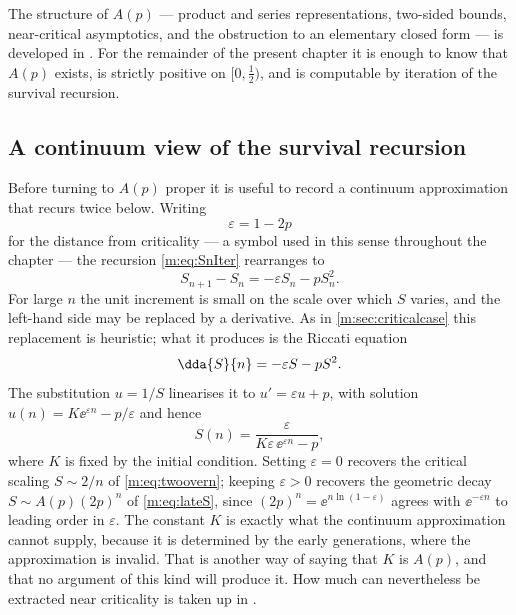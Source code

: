 The structure of $A(p)$ --- product and series representations, two-sided bounds,
near-critical asymptotics, and the obstruction to an elementary closed form --- is
developed in \ChA. For the remainder of the present chapter it is enough to know
that $A(p)$ exists, is strictly positive on $[0,\tfrac12)$, and is computable by
iteration of the survival recursion.

\subsection{A continuum view of the survival recursion}
\label{m:sec:riccati}

Before turning to $A(p)$ proper it is useful to record a continuum approximation
that recurs twice below. Writing
\begin{equation}
\label{m:eq:epsdef}
\varepsilon = 1-2p
\end{equation}
for the distance from criticality --- a symbol used in this sense throughout the
chapter --- the recursion \cref{m:eq:SnIter} rearranges to
\begin{equation}
\label{m:eq:Sdiff}
S_{n+1}-S_n = -\varepsilon S_n - pS_n^2 .
\end{equation}
For large $n$ the unit increment is small on the scale over which $S$ varies, and
the left-hand side may be replaced by a derivative. As in \cref{m:sec:criticalcase}
this replacement is heuristic; what it produces is the Riccati equation
\begin{equation}
\label{m:eq:riccati}
\dda{S}{n} = -\varepsilon S - pS^2 .
\end{equation}
The substitution $u=1/S$ linearises it to $u' = \varepsilon u + p$, with solution
$u(n) = K\ee^{\varepsilon n}-p/\varepsilon$ and hence
\begin{equation}
\label{m:eq:riccatisol}
S(n) = \frac{\varepsilon}{K\varepsilon\,\ee^{\varepsilon n}-p},
\end{equation}
where $K$ is fixed by the initial condition. Setting $\varepsilon=0$ recovers the
critical scaling $S\sim2/n$ of \cref{m:eq:twoovern}; keeping $\varepsilon>0$ recovers
the geometric decay $S\sim A(p)(2p)^n$ of \cref{m:eq:lateS}, since
$(2p)^n = \ee^{n\ln(1-\varepsilon)}$ agrees with $\ee^{-\varepsilon n}$ to leading
order in $\varepsilon$. The
constant $K$ is exactly what the continuum approximation cannot supply, because it
is determined by the early generations, where the approximation is invalid. That is
another way of saying that $K$ is $A(p)$, and that no argument of this kind will
produce it. How much can nevertheless be extracted near criticality is taken up in
\ChA.

\FloatBarrier
